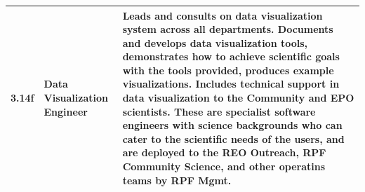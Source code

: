 \begin{longtable} {|p{}|p{}|p{}|}
{3.14f}&{Data Visualization Engineer}&{Leads and consults on data visualization system across all departments. Documents and develops data visualization tools, demonstrates how to achieve scientific goals with the tools provided, produces example visualizations. Includes technical support in data visualization to the Community and EPO scientists. These are specialist software engineers with science backgrounds who can cater to the scientific needs of the users, and are deployed to the REO Outreach, RPF Community Science, and other operatins teams by RPF Mgmt. } \\ \hline
\end{longtable} \normalsize
